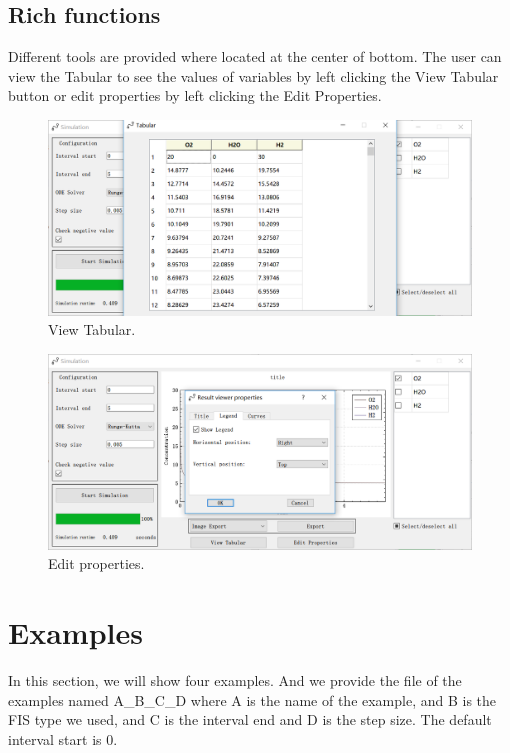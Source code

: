 \documentclass[journal,a4paper,onecolumn]{article}
\begin{document}
\subsection{Rich functions}
Different tools are provided where located at the center of bottom. The user can view the Tabular to see the values of variables by left clicking the View Tabular button or edit properties by left clicking the Edit Properties.
\begin{figure}[!hbt]
	\begin{center}
		\includegraphics[width=\columnwidth]{fig16}
		\caption{View Tabular.}
		\label{fig:View Tabular}
	\end{center}
\end{figure}
\begin{figure}[!hbt]
	\begin{center}
		\includegraphics[width=\columnwidth]{fig17}
		\caption{Edit properties.}
		\label{fig:Edit properties.}
	\end{center}
\end{figure}





\clearpage
\section{Examples}
In this section, we will show four examples. And we provide the file of the examples named A\_B\_C\_D where A is the name of the example, and B is the FIS type we used, and C is the interval end and D is the step size. The default interval start is 0. 
\end{document}
